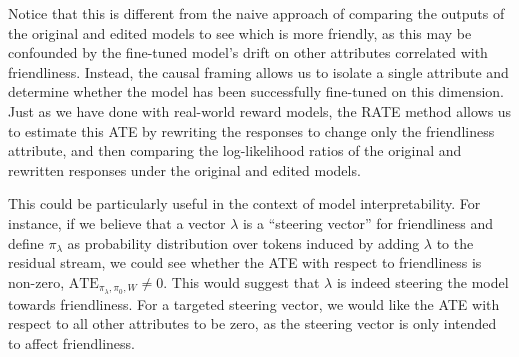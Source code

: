 \documentclass{article}
\theoremstyle{definition}
\begin{document}
Notice that this is different from the naive approach of comparing the outputs of the original and edited models to see which is more friendly, as this may be confounded by the fine-tuned model's drift on other attributes correlated with friendliness. Instead, the causal framing allows us to isolate a single attribute and determine whether the model has been successfully fine-tuned on this dimension. Just as we have done with real-world reward models, the RATE method allows us to estimate this ATE by rewriting the responses to change only the friendliness attribute, and then comparing the log-likelihood ratios of the original and rewritten responses under the original and edited models.

This could be particularly useful in the context of model interpretability. For instance, if we believe that a vector $\lambda$ is a ``steering vector'' for friendliness and define $\pi_\lambda$ as probability distribution over tokens induced by adding $\lambda$ to the residual stream, we could see whether the ATE with respect to friendliness is non-zero, $\text{ATE}_{\pi_\lambda, \pi_0, W} \neq 0$. This would suggest that $\lambda$ is indeed steering the model towards friendliness. For a targeted steering vector, we would like the ATE with respect to all other attributes to be zero, as the steering vector is only intended to affect friendliness.

\newpage
\appendix
\end{document}
